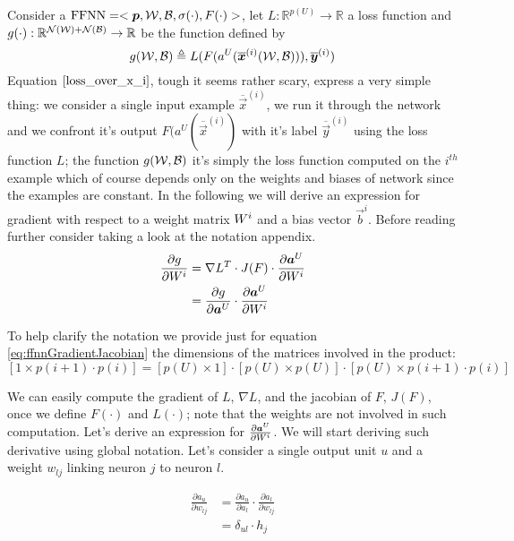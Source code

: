 Consider a $\mathrm{FFNN}=<\boldsymbol{p},\mathcal{W},\mathcal{B},\sigma(\cdot),F(\cdot)>$, let $L:\mathbb{R}^{p(U)} \rightarrow \mathbb{R}$ a loss function and 
$g(\cdot):\mathbb{R}^{\mathcal{N}(\mathcal{W})+\mathcal{N}(\mathcal{B})} \rightarrow \mathbb{R}$ be the function defined by
\begin{equation}
g(\mathcal{W},\mathcal{B}) \triangleq L(F(a^U( \overline{\boldsymbol{x}}^{(i)} (\mathcal{W},\mathcal{B}))),\overline{\boldsymbol{y}}^{(i)} )
\label{loss_over_x_i}
\end{equation}
Equation $\ref{loss_over_x_i}$, tough it seems rather scary, express a very simple thing: we consider a single input example 
$\overline{\vec{x}}^{(i)}$, we run it through the network and we confront it's output $F(a^U( \overline{\vec{x}}^{(i)}) $ with it's label
$\overline{\vec{y}}^{(i)}$ using the loss function $L$; the function $g(\mathcal{W},\mathcal{B})$ it's simply the loss function computed on the $i^{th}$ example
which of course depends only on the weights and biases of network since the examples are constant. In the following we will derive an expression for gradient with respect to a weight matrix $W^{i}$ and a bias vector $\vec{b}^i$. Before reading further consider taking a look at the notation appendix.
\begin{align}
\label{eq:ffnnGradientJacobian}
\frac{\partial g}{\partial W^i} &= \nabla L^T \cdot J(F) \cdot \frac{\partial \boldsymbol{a}^U}{\partial W^i}\\
&= \frac{\partial g}{\partial \boldsymbol{a}^U} \cdot \frac{\partial \boldsymbol{a}^U}{\partial W^i}
\end{align}

To help clarify the notation we provide just for equation \ref{eq:ffnnGradientJacobian} the dimensions of the matrices involved in the product:
$$[1\times p(i+1)\cdot p(i)] = [p(U)\times 1] \cdot [p(U)\times p(U)] \cdot [p(U)\times p(i+1)\cdot p(i)]$$ 

We can easily compute the gradient of $L$, $\nabla L$, and the jacobian of $F$, $J(F)$, once we define $F(\cdot)$ and $L(\cdot)$; note that the weights are not involved in such computation.
Let's derive an expression for $\frac{\partial \boldsymbol{a}^U}{\partial W^i}$.
We will start deriving such derivative using global notation. Let's consider a single output unit $u$ and a weight $w_{lj}$ linking neuron $j$ to neuron $l$.


\begin{align}
\frac{\partial a_u}{\partial w_{lj}} &= \frac{\partial a_u}{\partial a_l} \cdot \frac{\partial a_l}{\partial w_{lj}}\\
&=\delta_{ul} \cdot h_j
\end{align}

